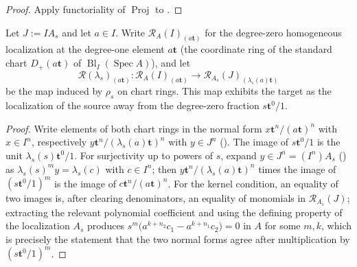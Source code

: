 \begin{proof}
  \leanok
  Apply functoriality of $\operatorname{Proj}$ to
  .
\end{proof}

\begin{proposition}
  \label{prop:nagata-rees-localization}
  \leanok

  Let $J:=IA_s$ and let $a\in I$.  Write
  $\mathcal R_A(I)_{(a\mathbf t)}$ for the degree-zero homogeneous
  localization at the degree-one element $a\mathbf t$ (the coordinate ring
  of the standard chart $D_+(a\mathbf t)$ of
  $\operatorname{Bl}_I(\operatorname{Spec}A)$), and let
  \[
    \mathcal R(\lambda_s)_{(a\mathbf t)}\colon
    \mathcal R_A(I)_{(a\mathbf t)}
    \longrightarrow
    \mathcal R_{A_s}(J)_{(\lambda_s(a)\mathbf t)}
  \]
  be the map induced by $\rho_s$ on chart rings.  This map exhibits the
  target as the localization of the source away from the degree-zero
  fraction $s\mathbf t^0/1$.
\end{proposition}

\begin{proof}
  \leanok
  Write elements of both chart rings in the normal form
  $x\mathbf t^n/(a\mathbf t)^n$ with $x\in I^n$, respectively
  $y\mathbf t^n/(\lambda_s(a)\mathbf t)^n$ with $y\in J^n$
  ().  The image of
  $s\mathbf t^0/1$ is the unit $\lambda_s(s)\mathbf t^0/1$.  For
  surjectivity up to powers of $s$, expand $y\in J^n=(I^n)A_s$
  () as
  $\lambda_s(s)^m y=\lambda_s(c)$ with $c\in I^n$; then
  $y\mathbf t^n/(\lambda_s(a)\mathbf t)^n$ times the image of
  $(s\mathbf t^0/1)^m$ is the image of
  $c\mathbf t^n/(a\mathbf t)^n$.  For the kernel condition, an equality of
  two images is, after clearing denominators, an equality of monomials in
  $\mathcal R_{A_s}(J)$; extracting the relevant polynomial coefficient
  and using the defining property of the localization $A_s$ produces
  $s^m\bigl(a^{k+n_2}c_1-a^{k+n_1}c_2\bigr)=0$ in $A$ for some
  $m,k$, which is precisely the statement that the two normal forms agree
  after multiplication by $(s\mathbf t^0/1)^m$.
\end{proof}

